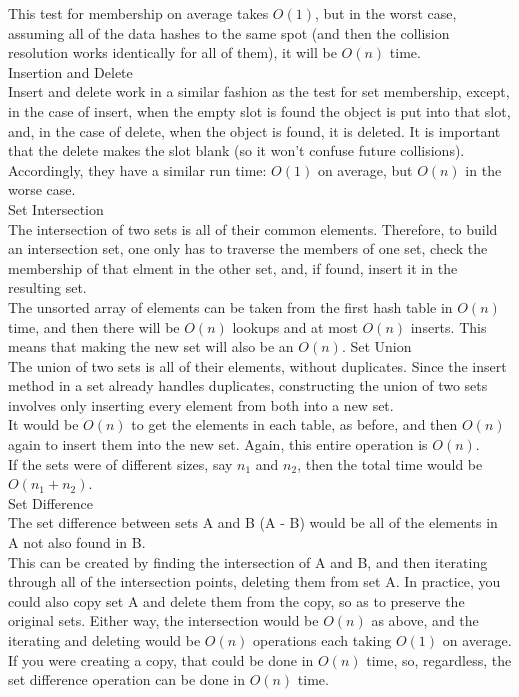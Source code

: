 \documentclass[12pt,twoside]{article}
\begin{document}
\begin{problems}
\begin{problemparts}
This test for membership on average takes $O(1)$, but in the worst case, assuming all of the data hashes to the same spot (and then the collision resolution works identically for all of them), it will be $O(n)$ time.\\

\problempart Insertion and Delete\\
Insert and delete work in a similar fashion as the test for set membership, except, in the case of insert, when the empty slot is found the object is put into that slot, and, in the case of delete, when the object is found, it is deleted.  It is important that the delete makes the slot blank (so it won't confuse future collisions).  Accordingly, they have a similar run time: $O(1)$ on average, but $O(n)$ in the worse case.\\

\problempart Set Intersection\\
The intersection of two sets is all of their common elements.  Therefore, to build an intersection set, one only has to traverse the members of one set, check the membership of that elment in the other set, and, if found, insert it in the resulting set.\\

The unsorted array of elements can be taken from the first hash table in $O(n)$ time, and then there will be $O(n)$ lookups and at most $O(n)$ inserts.  This means that making the new set will also be an $O(n)$.
\problempart Set Union\\
The union of two sets is all of their elements, without duplicates.  Since the insert method in a set already handles duplicates, constructing the union of two sets involves only inserting every element from both into a new set.\\

It would be $O(n)$ to get the elements in each table, as before, and then $O(n)$ again to insert them into the new set. Again, this entire operation is $O(n)$.\\

If the sets were of different sizes, say $n_1$ and $n_2$, then the total time would be $O(n_1 + n_2)$.\\
\problempart Set Difference\\
The set difference between sets A and B (A - B) would be all of the elements in A not also found in B.  \\

This can be created by finding the intersection of A and B, and then iterating through all of the intersection points, deleting them from set A.  In practice, you could also copy set A and delete them from the copy, so as to preserve the original sets.  Either way, the intersection would be $O(n)$ as above, and the iterating and deleting would be $O(n)$ operations each taking $O(1)$ on average.  If you were creating a copy, that could be done in $O(n)$ time, so, regardless, the set difference operation can be done in $O(n)$ time.
\end{problemparts}


\end{problems}
\end{document}

